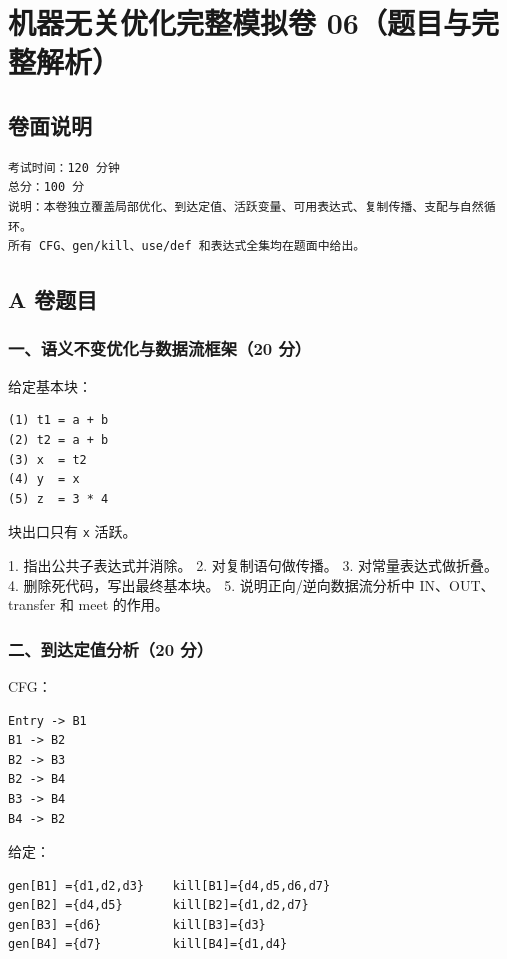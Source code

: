 \documentclass[UTF8]{ctexart}
\begin{document}
\section*{机器无关优化完整模拟卷 06（题目与完整解析）}

\subsection*{卷面说明}

\begin{Verbatim}[fontsize=\small,breaklines=true]
考试时间：120 分钟
总分：100 分
说明：本卷独立覆盖局部优化、到达定值、活跃变量、可用表达式、复制传播、支配与自然循环。
所有 CFG、gen/kill、use/def 和表达式全集均在题面中给出。
\end{Verbatim}

\subsection*{A 卷题目}

\subsubsection*{一、语义不变优化与数据流框架（20 分）}

给定基本块：

\begin{Verbatim}[fontsize=\small,breaklines=true]
(1) t1 = a + b
(2) t2 = a + b
(3) x  = t2
(4) y  = x
(5) z  = 3 * 4
\end{Verbatim}

块出口只有 \texttt{x} 活跃。

1. 指出公共子表达式并消除。 2. 对复制语句做传播。 3. 对常量表达式做折叠。 4. 删除死代码，写出最终基本块。 5. 说明正向/逆向数据流分析中 IN、OUT、transfer 和 meet 的作用。

\subsubsection*{二、到达定值分析（20 分）}

CFG：

\begin{Verbatim}[fontsize=\small,breaklines=true]
Entry -> B1
B1 -> B2
B2 -> B3
B2 -> B4
B3 -> B4
B4 -> B2
\end{Verbatim}

给定：

\begin{Verbatim}[fontsize=\small,breaklines=true]
gen[B1] ={d1,d2,d3}    kill[B1]={d4,d5,d6,d7}
gen[B2] ={d4,d5}       kill[B2]={d1,d2,d7}
gen[B3] ={d6}          kill[B3]={d3}
gen[B4] ={d7}          kill[B4]={d1,d4}
\end{Verbatim}
\end{document}
